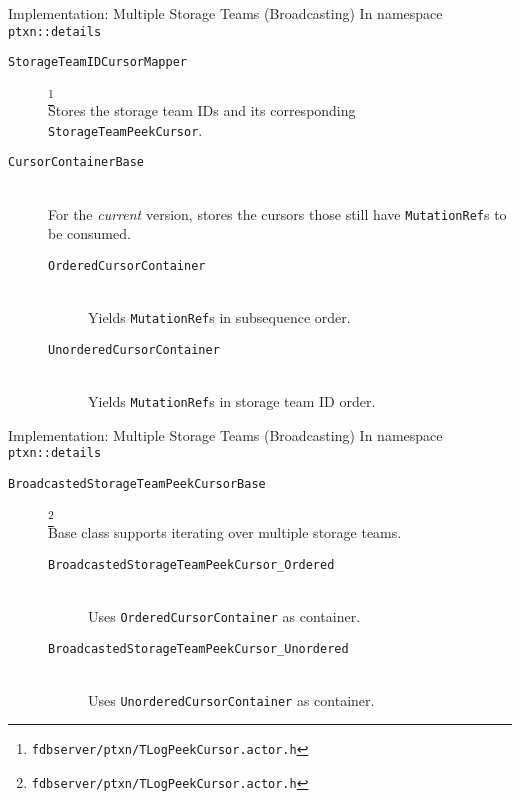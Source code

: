 \documentclass[9pt]{beamer}
\begin{document}
    \begin{frame}{Implementation: Multiple Storage Teams (Broadcasting)}
        In namespace \texttt{ptxn::details}
        \begin{description}
            \item[\texttt{StorageTeamIDCursorMapper}]\footnote{\label{tlogpeekcursor_1}\texttt{fdbserver/ptxn/TLogPeekCursor.actor.h}} \hfill\\
            \noindent Stores the storage team IDs and its corresponding \texttt{StorageTeamPeekCursor}.
            \item[\texttt{CursorContainerBase}]\footnotemark[1]\hfill\\  %
            \noindent For the \emph{current} version, stores the cursors those still have \texttt{MutationRef}s to be consumed.
            \begin{description}
                \item[\texttt{OrderedCursorContainer}]\hfill\\
                Yields \texttt{MutationRef}s in subsequence order.
                \item[\texttt{UnorderedCursorContainer}]\hfill\\
                Yields \texttt{MutationRef}s in storage team ID order.
            \end{description}
        \end{description}
    \end{frame}
    
    \begin{frame}{Implementation: Multiple Storage Teams (Broadcasting)}
        In namespace \texttt{ptxn::details}
        \begin{description}
            \item[\texttt{BroadcastedStorageTeamPeekCursorBase}]\footnote{\texttt{fdbserver/ptxn/TLogPeekCursor.actor.h}}\hfill\\
            Base class supports iterating over multiple storage teams.
            \begin{description}
                \item[\texttt{BroadcastedStorageTeamPeekCursor\_Ordered}]\hfill\\
                Uses \texttt{OrderedCursorContainer} as container.
                \item[\texttt{BroadcastedStorageTeamPeekCursor\_Unordered}]\hfill\\
                Uses \texttt{UnorderedCursorContainer} as container.
            \end{description}
        \end{description}
    \end{frame}
    
\end{document}
